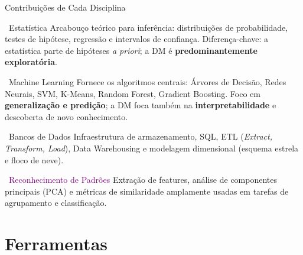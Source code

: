 \documentclass[aspectratio=169]{beamer}
\begin{document}
\begin{frame}{Contribuições de Cada Disciplina}
    \begin{block}{\textcolor{mineblue}{\faLineChart\ Estatística}}
        Arcabouço teórico para inferência: distribuições de probabilidade, testes de hipótese, regressão e intervalos de confiança. Diferença-chave: a estatística parte de hipóteses \textit{a priori}; a DM é \textbf{predominantemente exploratória}.
    \end{block}
    \vspace{0.15cm}
    \begin{block}{\textcolor{mineorange}{\faCogs\ Machine Learning}}
        Fornece os algoritmos centrais: Árvores de Decisão, Redes Neurais, SVM, K-Means, Random Forest, Gradient Boosting. Foco em \textbf{generalização e predição}; a DM foca também na \textbf{interpretabilidade} e descoberta de novo conhecimento.
    \end{block}
    \vspace{0.15cm}
    \begin{block}{\textcolor{minegreen}{\faDatabase\ Bancos de Dados}}
        Infraestrutura de armazenamento, SQL, ETL (\textit{Extract, Transform, Load}), Data Warehousing e modelagem dimensional (esquema estrela e floco de neve).
    \end{block}
    \vspace{0.15cm}
    \begin{block}{\textcolor{purple}{\faEye\ Reconhecimento de Padrões}}
        Extração de features, análise de componentes principais (PCA) e métricas de similaridade amplamente usadas em tarefas de agrupamento e classificação.
    \end{block}
\end{frame}

\section{Ferramentas}
\end{document}
